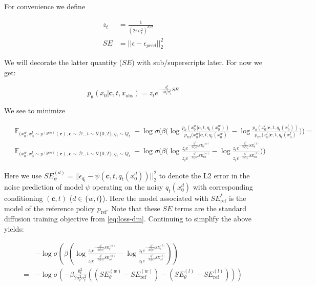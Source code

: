 \documentclass[10pt,twocolumn,letterpaper]{article}
\newcommand{\xobs}{x_{\text{obs}}}
\newcommand{\vc}{\ensuremath{\boldsymbol{c}}}
\newcommand{\pref}{p_{\text{ref}}}
\begin{document}
For convenience we define 

\begin{align}
    z_t &= \frac{1}{(2 \pi \sigma_t^2)^{d/2}} \\
    SE &= || \epsilon - \epsilon_{pred} ||_2^2
\end{align}

We will decorate the latter quantity ($SE$) with sub/superscripts later. For now we get:

\begin{equation}
    p_{\theta}(x_0 |\vc, t, \xobs) = z_t e ^ {-\frac{b_t^2}{2a_t^2 \sigma_t^2}  SE}
\end{equation}

We see to minimize

\begin{align}
    & \mathop{\mathbb{E}}_{(x_0^w, x_0^l \sim p^{(gen)}(\vc); \vc \sim \mathcal{D},; t \sim \mathcal{U}\{0,T\}; q_t \sim Q_t}
    - \log \sigma \biggl( \beta \biggl( \log \frac{p_\theta (x^w_0|\vc, t,q_t(x^w_0)) }{ \pref (x^w_0|\vc, t,q_t(x^w_0) }  
    - \log \frac{p_\theta (x^l_0|\vc, t,q_t(x^l_0)) }{ \pref (x^l_0|\vc, t,q_t(x^l_0) }      \biggr)  \biggr) =  \\
     & \mathop{\mathbb{E}}_{(x_0^w, x_0^l \sim p^{(gen)}(\vc); \vc \sim \mathcal{D},; t \sim \mathcal{U}\{0,T\}; q_t \sim Q_t} - \log \sigma \biggl( \beta \biggl( \log \frac{z_t e ^ {-\frac{b_t^2}{2a_t^2 \sigma_t^2} SE_\theta^{(w)} }}{ z_t e ^ {-\frac{b_t^2}{2a_t^2 \sigma_t^2}  SE_{\text{ref}}^{(w)} } }  - \log \frac{z_t e ^ {-\frac{b_t^2}{2a_t^2 \sigma_t^2}  SE_\theta^{(l)} }}{ z_t e ^ {-\frac{b_t^2}{2a_t^2 \sigma_t^2} SE_{\text{ref}}^{(l)} } }    \biggr)  \biggr)
\end{align}






Here we use $SE^{(d)}_{\psi} = ||\epsilon_{q_t} - \psi(\vc, t, q_t(x^d_0))||^2_2$ to denote the L2 error in the noise prediction of model $\psi$ operating on the noisy $q_t(x^d_0)$ with corresponding conditioning $(\vc,t)$ ($d \in \{w, l\}$). Here the model associated with $SE^*_{\text{ref}}$ is the model of the reference policy $\pref$. Note that these $SE$ terms are the standard diffusion training objective from \cref{eq:loss-dm}. Continuing to simplify the above yields:

\begin{align}
  & - \log \sigma \left( \beta \left( \log \frac{z_t e ^ {-\frac{b_t^2}{2a_t^2 \sigma_t^2} SE_\theta^{(w)} }}{ z_t e ^ {-\frac{b_t^2}{2a_t^2 \sigma_t^2}  SE_{\text{ref}}^{(w)} } }  - \log \frac{z_t e ^ {-\frac{b_t^2}{2a_t^2 \sigma_t^2}  SE_\theta^{(l)} }}{ z_t e ^ {-\frac{b_t^2}{2a_t^2 \sigma_t^2} SE_{\text{ref}}^{(l)} } }    \right)  \right)  \\
  = &- \log \sigma \left( - \beta \frac{b_t^2}{2a_t^2 \sigma_t^2} \left( (SE_\theta^{(w)} - SE_{\text{ref}}^{(w)} ) - (SE_\theta^{(l)} - SE_{\text{ref}}^{(l)} ) \right)    \right)   
\end{align}
\end{document}
